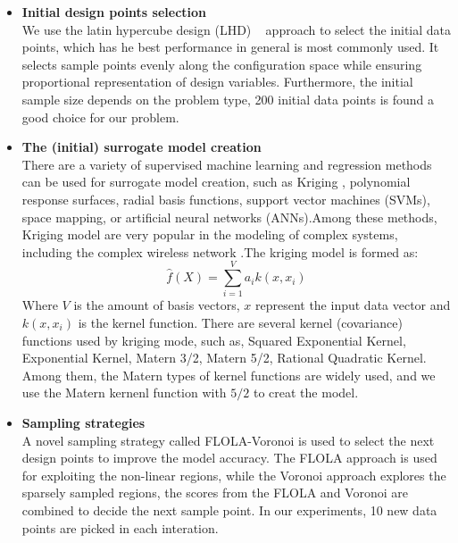 \begin{itemize}
\item \textbf{Initial design points selection}  \\
 We use the latin hypercube design (LHD) ~\cite{FAViana2013} approach to select the initial data points, which has he best performance in general is  most commonly used. It selects sample points evenly along the configuration space while ensuring proportional representation of design variables. Furthermore, the initial sample size depends on the problem type, 200 initial data points is found a good choice for our problem.
 
\item \textbf{The (initial) surrogate model creation}  \\
There are a variety of supervised machine learning and regression methods can be used for surrogate model creation, such as Kriging \cite{forrester2008engineering}, polynomial response surfaces, radial basis functions, support vector machines (SVMs),  space mapping, or artificial neural networks (ANNs).Among these methods, Kriging model are 
very popular in the modeling of  complex systems, including the complex wireless network \cite{SUMOWirelessConferencing,wowmom2018, LTEoptimization}.The kriging model is formed as:
\begin{equation}
\hat{f} (X) = \sum_{i=1}^{V} {a_i}{k(x, x_i)}
\end{equation}
Where $V$ is the amount of basis vectors, $x$ represent the input data vector and $k(x, x_i)$ is the kernel function. There are several kernel (covariance) functions used by kriging mode, such as, Squared Exponential Kernel, Exponential Kernel, Matern 3/2, Matern 5/2, Rational Quadratic Kernel. Among them, the Matern types of kernel functions are  widely used, and we use the Matern kernenl function with %
$5/2$ to creat the model. 

\item \textbf{Sampling strategies} \\
A novel sampling strategy called FLOLA-Voronoi \cite{vanderherten2015} is used to select the next design points to improve the model accuracy.  The FLOLA approach is used for exploiting the non-linear regions, while the Voronoi approach explores the sparsely sampled regions, the scores from  the FLOLA and Voronoi are combined to decide the next sample point. In our experiments, 10 new data points are picked in each interation.

 



\end{itemize}
